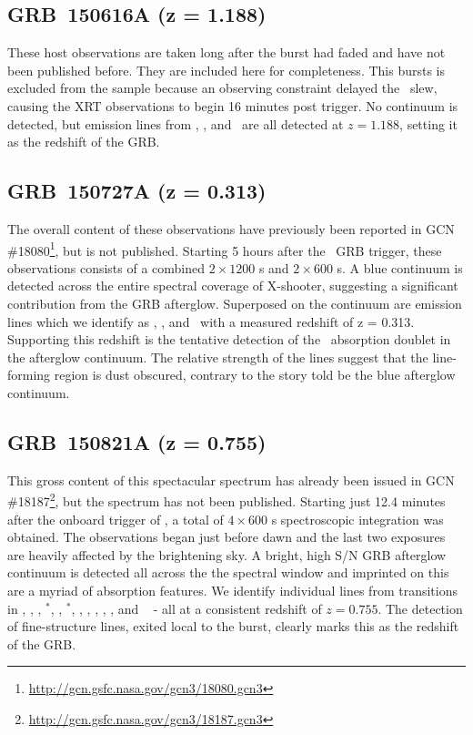 \documentclass{aa}    %
\begin{document}
\subsection{GRB~150616A (z = 1.188)}	

These host observations are taken long after the burst had faded  and have not
been published before. They are included here for completeness. This bursts is
excluded from the sample because an observing constraint delayed the
\swift~slew, causing the XRT observations to begin 16 minutes post trigger. No
continuum is detected, but emission lines from \oii, \oiii, and \ha~are all
detected at $z = 1.188$, setting it as the redshift of the GRB.

\subsection{GRB~150727A (z = 0.313)}	

The overall content of these observations have previously been reported in GCN
\#18080\footnote{\url{http://gcn.gsfc.nasa.gov/gcn3/18080.gcn3}}, but is not
published. Starting 5 hours after the \swift~GRB trigger, these observations
consists of a combined $2 \times 1200$ s and $2 \times 600$ s. A blue continuum
is detected across the entire spectral coverage of X-shooter, suggesting a
significant contribution from the GRB afterglow. Superposed on the continuum are
emission lines which we identify as \hb, \oiii, and \ha~with a measured 
redshift of z = 0.313. Supporting this redshift is the tentative detection of
the \mgii~absorption doublet in the afterglow continuum. The relative strength
of the lines suggest that the line-forming region is dust obscured, contrary to
the story told be the blue afterglow continuum.

\subsection{GRB~150821A (z = 0.755)}	

This gross content of this spectacular spectrum has already been issued in GCN
\#18187\footnote{\url{http://gcn.gsfc.nasa.gov/gcn3/18187.gcn3}}, but the
spectrum has not been published. Starting just 12.4 minutes after the onboard
trigger of \swift, a total of $4 \times 600$ s spectroscopic integration was
obtained. The observations began just before dawn and the last two exposures are
heavily affected by the brightening sky. A bright, high S/N GRB afterglow
continuum is detected all across the the spectral window and imprinted on this
are a myriad of absorption features. We identify individual lines from
transitions in \aliii, \crii, \znii, \NIii$^*$, \feii, \feii$^*$, \scii, \mnii,
\mgii, \mgi, \TIii, and  \caii~ - all at a consistent redshift of $z = 0.755$.
The detection of fine-structure lines, exited local to the burst, clearly marks
this as the redshift of the GRB.
\end{document}
